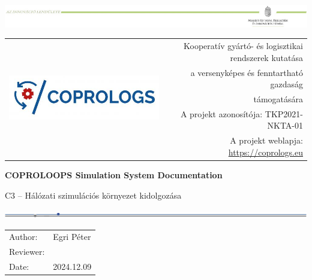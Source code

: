 \documentclass{article}
\newcommand{\NAME}{COPROLOOPS }
\begin{document}
\begin{titlepage}
	\thispagestyle{titlep}
	   \includegraphics[width=\textwidth]{header-crop.pdf}
       \vspace*{1cm}
       
       \begin{tabular}{lr}
    	   \multirow{5}{0.35\textwidth}{\includegraphics{logo.png}} & {\small Kooperatív gyártó- és logisztikai rendszerek kutatása} \\
			& {\small a versenyképes és fenntartható gazdaság} \\
			& {\small támogatására} \\[2mm]
			& {\scriptsize A projekt azonosítója: TKP2021-NKTA-01} \\
			& {\scriptsize A projekt weblapja: \href{https://coprologs.eu}{https://coprologs.eu}} \\
       \end{tabular}
        \vspace*{3cm}

		\noindent
       \textbf{{\LARGE \NAME Simulation System Documentation}}

       \vspace{0.5cm}
       \noindent
        {\Large C3 -- Hálózati szimulációs környezet kidolgozása}
            
       \vspace{1cm}
       
       \noindent
       \includegraphics[width=\textwidth]{line.png}
       
       \vspace*{1cm}
       \noindent
       \begin{tabular}{ll}
       		Author: & Egri Péter \\
       		Reviewer: & \\
       		Date: & 2024.12.09 \\       
       \end{tabular}



\end{titlepage}
\end{document}
